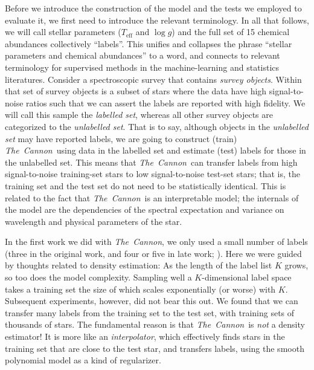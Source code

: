 \documentclass[12pt,preprint]{aastex}
\newcommand{\project}[1]{\textsl{#1}}
\newcommand{\TheCannon}{\project{The~Cannon}}
\newcommand{\logg}{\log g}
\newcommand{\Teff}{T_{\mathrm{eff}}}
\begin{document}


Before we introduce the construction of the model and the tests we employed to
evaluate it, we first need to introduce the relevant terminology.  In all that 
follows, we will call stellar parameters ($\Teff$ and $\logg$) and the full set
of 15 chemical abundances collectively ``labels''.  This unifies and collapses 
the phrase ``stellar parameters and chemical abundances'' to a word, and 
connects to relevant terminology for supervised methods in the machine-learning
and statistics literatures.  Consider a spectroscopic survey that contains 
\emph{survey objects}.  Within that set of survey objects is a subset of stars 
where the data have high signal-to-noise ratios such that we can assert the 
labels are reported with high fidelity.  We will call this sample the 
\emph{labelled set}, whereas all other survey objects are categorized to the
\emph{unlabelled set}.  That is to say, although objects in the 
\emph{unlabelled set} may have reported labels, we are going to construct
(train) \TheCannon\ using data in the labelled set and estimate (test) labels 
for those in the unlabelled set.  This means that \TheCannon\ can transfer 
labels from high signal-to-noise training-set stars to low signal-to-noise 
test-set stars; that is, the training set and the test set do not need to be 
statistically identical.  This is related to the fact that \TheCannon\ is an 
interpretable model; the internals of the model are the dependencies of the 
spectral expectation and variance on wavelength and physical parameters of the 
star.








In the first work we did with \TheCannon, we only used a small number of labels
(three in the original work, and four or five in late work; \citealt{tc, age}). 
Here we were guided by thoughts related to density estimation: As the length of 
the label list $K$ grows, so too does the model complexity.  Sampling well a 
$K$-dimensional label space takes a training set the size of which scales 
exponentially (or worse) with $K$.  Subsequent experiments, however, did not 
bear this out. We found that we can transfer many labels from the training set 
to the test set, with training sets of thousands of stars.  The fundamental 
reason is that \TheCannon\ is \emph{not} a density estimator!  It is more like 
an \emph{interpolator}, which effectively finds stars in the training set that 
are close to the test star, and transfers labels, using the smooth polynomial 
model as a kind of regularizer.
\end{document}
